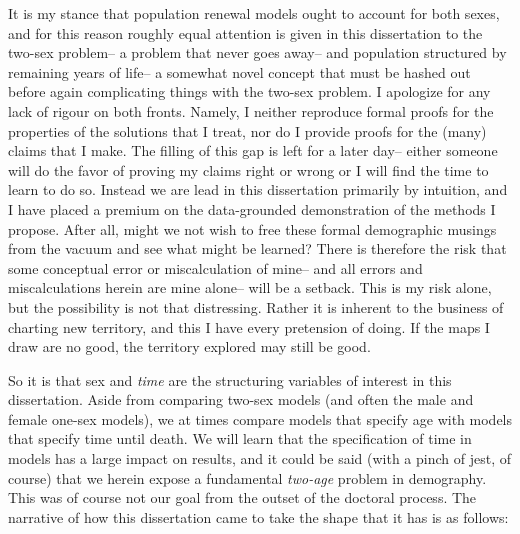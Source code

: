 It is my stance that population renewal models ought to account for both sexes,
and for this reason roughly equal attention is given in this dissertation to the
two-sex problem-- a problem that never goes away-- and population structured
by remaining years of life-- a somewhat novel concept that must be hashed out
before again complicating things with the two-sex problem. I apologize for any lack of
rigour on both fronts. Namely, I neither reproduce formal proofs for the
properties of the solutions that I treat, nor do I provide proofs for the
(many) claims that I make. The filling of this gap is left for a later day--
either someone will do the favor of proving my claims right or wrong or I
will find the time to learn to do so. Instead we are lead in this dissertation
primarily by intuition, and I have placed a premium on the
data-grounded demonstration of the methods I propose. After all, might we not
wish to free these formal demographic musings from the vacuum and see what might
be learned? There is therefore the risk that some conceptual error or
miscalculation of mine-- and all errors and miscalculations herein are mine
alone-- will be a setback. This is my risk alone, but the possibility is
not that distressing. Rather it is inherent to the business of charting new
territory, and this I have every pretension of doing. If the maps I draw are no
good, the territory explored may still be good.

So it is that sex and \textit{time} are the structuring variables of
interest in this dissertation. Aside from comparing two-sex models (and often the male
and female one-sex models), we at times compare models that
specify age with models that specify time until death. We will learn that the
specification of time in models has a large impact on results, and it could
be said (with a pinch of jest, of course) that we herein expose a
fundamental \textit{two-age} problem in demography. This was of course not our goal from the
outset of the doctoral process. The narrative of how this dissertation came to
take the shape that it has is as follows:

